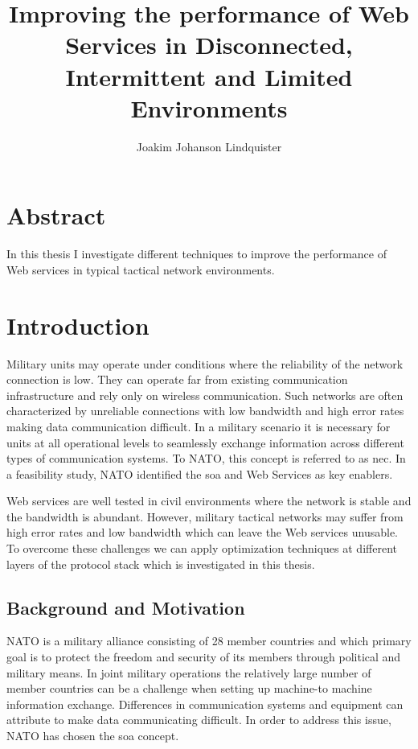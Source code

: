 \documentclass[USenglish]{ifimaster}
\title{Improving the performance of Web Services in Disconnected, Intermittent
and Limited Environments}
\author{Joakim Johanson Lindquister}
\begin{document}
\ififorside{}

\chapter*{Abstract}
In this thesis I investigate different techniques to improve the performance of
Web services in typical tactical network environments.
\pagebreak

\tableofcontents
\listoftables
\listoffigures

\pagebreak


\chapter{Introduction}
Military units may operate under conditions where the reliability of the network
connection is low. They can operate far from existing communication
infrastructure and rely only on wireless communication. Such networks are often
characterized by unreliable connections with low bandwidth and high error rates
making data communication difficult. In a military scenario it is necessary for
units at all operational levels to seamlessly exchange information across
different types of communication systems. To NATO, this concept is referred to
as \gls{nec}. In a feasibility study, NATO identified the \gls{soa} and Web
Services as key enablers\cite{nnec-study}.

Web services are well tested in civil environments where the network is stable
and the bandwidth is abundant. However, military tactical networks may suffer
from high error rates and low bandwidth which can leave the Web services
unusable. To overcome these challenges we can apply optimization techniques at
different layers of the protocol stack which is investigated in this thesis.

\section{Background and Motivation}
NATO is a military alliance consisting of 28 member
countries\cite{nato-homepage-member-countries} and which primary goal is to
protect the freedom and security of its members through political and military
means. In joint military operations the relatively large number of member
countries can be a challenge when setting up machine-to machine information
exchange. Differences in communication systems and equipment can attribute to
make data communicating difficult. In order to address this issue, NATO has
chosen the \gls{soa} concept\cite{IST-090}.
\end{document}
